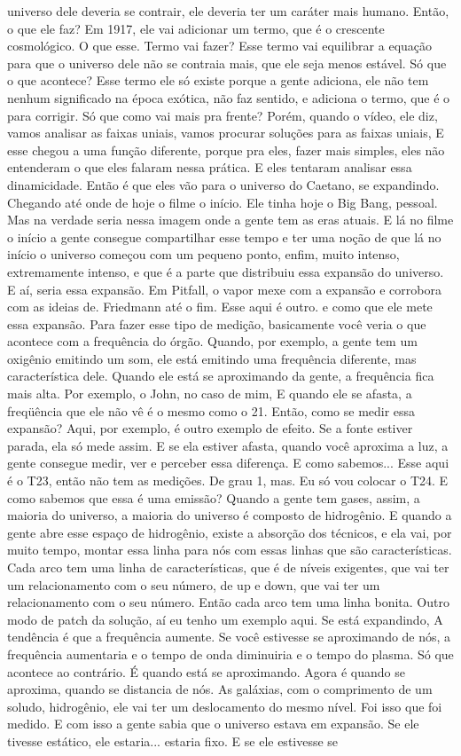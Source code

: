 \documentclass[
	article,			%
	11pt,				%
	twoside,			%
	a4paper,			%
	english,			%
	brazil,				%
	sumario=tradicional
	]{abntex2}
\begin{document}
universo dele deveria se contrair, ele deveria ter um caráter mais humano. Então, o que ele faz? Em 1917, ele vai adicionar um termo, que é o crescente cosmológico. O que esse. Termo vai fazer? Esse termo vai equilibrar a equação para que o universo dele não se contraia mais, que ele seja menos estável. Só que o que acontece? Esse termo ele só existe porque a gente adiciona, ele não tem nenhum significado na época exótica, não faz sentido, e adiciona o termo, que é o para corrigir. Só que como vai mais pra frente? Porém, quando o vídeo, ele diz, vamos analisar as faixas uniais, vamos procurar soluções para as faixas uniais, E esse chegou a uma função diferente, porque pra eles, fazer mais simples, eles não entenderam o que eles falaram nessa prática. E eles tentaram analisar essa dinamicidade. Então é que eles vão para o universo do Caetano, se expandindo. Chegando até onde de hoje o filme o início. Ele tinha hoje o Big Bang, pessoal. Mas na verdade seria nessa imagem onde a gente tem as eras atuais. E lá no filme o início a gente consegue compartilhar esse tempo e ter uma noção de que lá no início o universo começou com um pequeno ponto, enfim, muito intenso, extremamente intenso, e que é a parte que distribuiu essa expansão do universo. E aí, seria essa expansão. Em Pitfall, o vapor mexe com a expansão e corrobora com as ideias de. Friedmann até o fim. Esse aqui é outro. e como que ele mete essa expansão. Para fazer esse tipo de medição, basicamente você veria o que acontece com a frequência do órgão. Quando, por exemplo, a gente tem um oxigênio emitindo um som, ele está emitindo uma frequência diferente, mas característica dele. Quando ele está se aproximando da gente, a frequência fica mais alta. Por exemplo, o John, no caso de mim, E quando ele se afasta, a freqüência que ele não vê é o mesmo como o 21. Então, como se medir essa expansão? Aqui, por exemplo, é outro exemplo de efeito. Se a fonte estiver parada, ela só mede assim. E se ela estiver afasta, quando você aproxima a luz, a gente consegue medir, ver e perceber essa diferença. E como sabemos... Esse aqui é o T23, então não tem as medições. De grau 1, mas. Eu só vou colocar o T24. E como sabemos que essa é uma emissão? Quando a gente tem gases, assim, a maioria do universo, a maioria do universo é composto de hidrogênio. E quando a gente abre esse espaço de hidrogênio, existe a absorção dos técnicos, e ela vai, por muito tempo, montar essa linha para nós com essas linhas que são características. Cada arco tem uma linha de características, que é de níveis exigentes, que vai ter um relacionamento com o seu número, de up e down, que vai ter um relacionamento com o seu número. Então cada arco tem uma linha bonita. Outro modo de patch da solução, aí eu tenho um exemplo aqui. Se está expandindo, A tendência é que a frequência aumente. Se você estivesse se aproximando de nós, a frequência aumentaria e o tempo de onda diminuiria e o tempo do plasma. Só que acontece ao contrário. É quando está se aproximando. Agora é quando se aproxima, quando se distancia de nós. As galáxias, com o comprimento de um soludo, hidrogênio, ele vai ter um deslocamento do mesmo nível. Foi isso que foi medido. E com isso a gente sabia que o universo estava em expansão. Se ele tivesse estático, ele estaria... estaria fixo. E se ele estivesse se 
\end{document}
